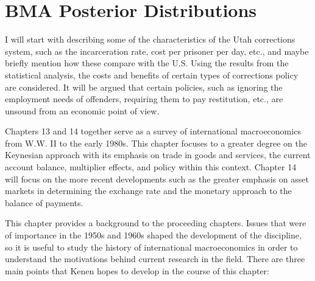 \chapter{BMA Posterior Distributions}\label{appendix}
\fixchapterheading

\vspace{0.7cm}

I will start with describing some of the characteristics of the Utah corrections system, such as the incarceration rate, cost per prisoner per day, etc., and maybe briefly mention how these compare with the U.S.  Using the results from the statistical analysis, the costs and benefits of certain types of corrections policy are considered.  It will be argued that certain policies, such as ignoring the employment needs of offenders, requiring them to pay restitution, etc., are unsound from an economic point of view.

Chapters 13 and 14 together serve as a survey of international
macroeconomics from W.W. II to the early 1980s.  This chapter
focuses to a greater degree on the Keynesian approach with its
emphasis on trade in goods and services, the current account
balance, multiplier effects, and policy within this context. Chapter
14 will focus on the more recent developments such as the greater
emphasis on asset markets in determining the exchange rate and the
monetary approach to the balance of payments.

This chapter provides a background to the proceeding chapters.
Issues that were of importance in the 1950s and 1960s shaped the
development of the discipline, so it is useful to study the history
of international macroeconomics in order to understand the
motivations behind current research in the field. There are three
main points that Kenen hopes to develop in the course of this
chapter: 

